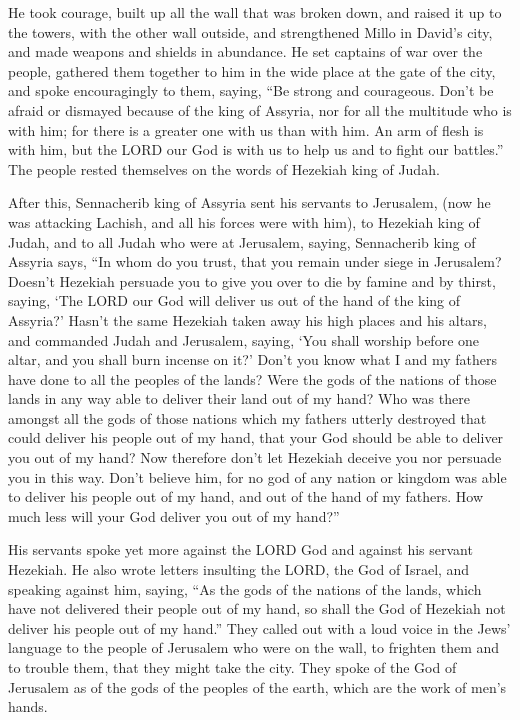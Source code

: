  He took courage, built up all the wall that was broken
down, and raised it up to the towers, with the other wall outside, and
strengthened Millo in David's city, and made weapons and shields in
abundance.  He set captains of war over the people,
gathered them together to him in the wide place at the gate of the city,
and spoke encouragingly to them, saying,  ``Be strong and
courageous. Don't be afraid or dismayed because of the king of Assyria,
nor for all the multitude who is with him; for there is a greater one
with us than with him.  An arm of flesh is with him, but
the LORD our God is with us to help us and to fight our battles.'' The
people rested themselves on the words of Hezekiah king of Judah.

 After this, Sennacherib king of Assyria sent his servants
to Jerusalem, (now he was attacking Lachish, and all his forces were
with him), to Hezekiah king of Judah, and to all Judah who were at
Jerusalem, saying,  Sennacherib king of Assyria says,
``In whom do you trust, that you remain under siege in Jerusalem?
 Doesn't Hezekiah persuade you to give you over to die by
famine and by thirst, saying, `The LORD our God will deliver us out of
the hand of the king of Assyria?'  Hasn't the same
Hezekiah taken away his high places and his altars, and commanded Judah
and Jerusalem, saying, `You shall worship before one altar, and you
shall burn incense on it?'  Don't you know what I and my
fathers have done to all the peoples of the lands? Were the gods of the
nations of those lands in any way able to deliver their land out of my
hand?  Who was there amongst all the gods of those
nations which my fathers utterly destroyed that could deliver his people
out of my hand, that your God should be able to deliver you out of my
hand?  Now therefore don't let Hezekiah deceive you nor
persuade you in this way. Don't believe him, for no god of any nation or
kingdom was able to deliver his people out of my hand, and out of the
hand of my fathers. How much less will your God deliver you out of my
hand?''

 His servants spoke yet more against the LORD God and
against his servant Hezekiah.  He also wrote letters
insulting the LORD, the God of Israel, and speaking against him, saying,
``As the gods of the nations of the lands, which have not delivered
their people out of my hand, so shall the God of Hezekiah not deliver
his people out of my hand.''  They called out with a loud
voice in the Jews' language to the people of Jerusalem who were on the
wall, to frighten them and to trouble them, that they might take the
city.  They spoke of the God of Jerusalem as of the gods
of the peoples of the earth, which are the work of men's hands.


